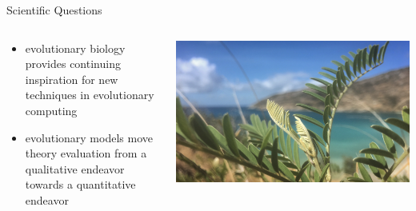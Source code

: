 \begin{frame}{Scientific Questions}
\begin{columns}
\begin{column}{0.6\textwidth}
\begin{itemize}
\item evolutionary biology provides continuing inspiration for new techniques in evolutionary computing
\item evolutionary models move theory evaluation from a qualitative endeavor towards a quantitative endeavor
\end{itemize}
\end{column}
\begin{column}{0.4\textwidth}
\begin{center}
\includegraphics[width=\textwidth,trim={43cm 0 47cm 0},clip]{img/island_fern}
\end{center}
\end{column}
\end{columns}
\end{frame}

